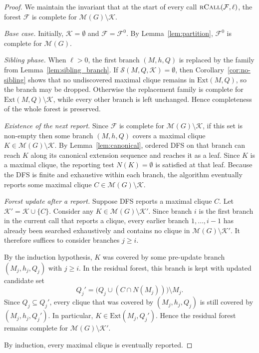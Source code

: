 \documentclass[sigconf, nonacm]{acmart}
\theoremstyle{definition}
\theoremstyle{remark}
\begin{document}
\begin{proof}
We maintain the invariant that at the start of every call
$\textsc{rCall}(\mathcal{F},\ell)$, the forest $\mathcal{F}$ is complete for
$\mathcal{M}(G) \setminus \mathcal{K}$.

\emph{Base case.}  Initially, $\mathcal{K}=\emptyset$ and
$\mathcal{F}=\mathcal{F}^0$.  By Lemma~\ref{lem:partition},
$\mathcal{F}^0$ is complete for $\mathcal{M}(G)$.

\emph{Sibling phase.}  When $\ell>0$, the first branch $(M,h,Q)$ is replaced by
the family from Lemma~\ref{lem:sibling_branch}.  If
$\mathcal{S}(M,Q,\mathcal{K})=\emptyset$, then Corollary~\ref{cor:no-sibling}
shows that no undiscovered maximal clique remains in $\mathrm{Ext}(M,Q)$, so
the branch may be dropped.  Otherwise the
replacement family is complete for $\mathrm{Ext}(M,Q) \setminus \mathcal{K}$,
while every other branch is left unchanged.  Hence completeness of the whole
forest is preserved.

\emph{Existence of the next report.}  Since $\mathcal{F}$ is complete for
$\mathcal{M}(G)\setminus\mathcal{K}$, if this set is non-empty then some branch
$(M,h,Q)$ covers a maximal clique $K \in \mathcal{M}(G)\setminus\mathcal{K}$.
By Lemma~\ref{lem:canonical}, ordered DFS on that branch can reach $K$ along
its canonical extension sequence and reaches it as a leaf.  Since $K$ is a
maximal clique, the reporting test $N(K)=\emptyset$ is satisfied at that leaf.
Because the DFS is finite and exhaustive within each branch, the algorithm
eventually reports some maximal clique $C \in
\mathcal{M}(G)\setminus\mathcal{K}$.

\emph{Forest update after a report.}  Suppose DFS reports a maximal clique $C$.
Let $\mathcal{K}' = \mathcal{K} \cup \{C\}$.  Consider any
$K \in \mathcal{M}(G) \setminus \mathcal{K}'$.
Since branch $i$ is the first branch in the current call that reports a clique,
every earlier branch $1,\ldots,i-1$ has already been searched exhaustively and
contains no clique in $\mathcal{M}(G)\setminus\mathcal{K}'$.  It therefore
suffices to consider branches $j \ge i$.

By the induction hypothesis, $K$ was covered by some pre-update branch
$(M_j,h_j,Q_j)$ with $j \ge i$.  In the residual forest, this branch is kept
with updated candidate set
\[
  Q_j' = \bigl(Q_j \cup (C \cap N(M_j))\bigr) \setminus M_j.
\]
Since $Q_j \subseteq Q_j'$, every clique that was covered by $(M_j,h_j,Q_j)$ is
still covered by $(M_j,h_j,Q_j')$.  In particular,
$K \in \mathrm{Ext}(M_j,Q_j')$.  Hence the residual forest remains complete for
$\mathcal{M}(G) \setminus \mathcal{K}'$.

By induction, every maximal clique is eventually reported.
\end{proof}
\end{document}
